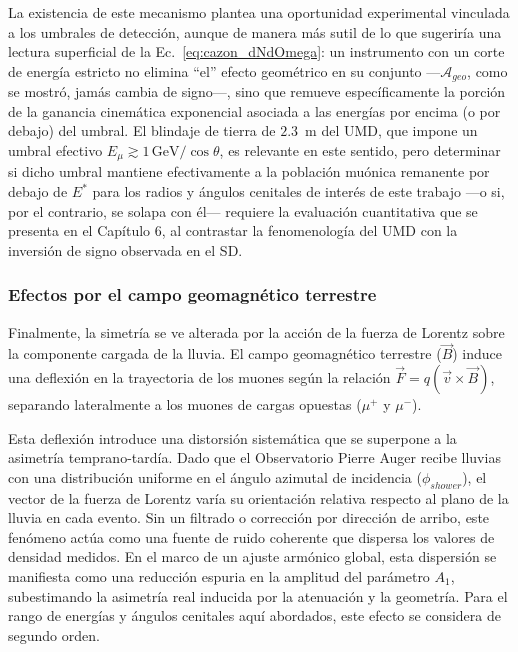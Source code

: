 La existencia de este mecanismo plantea una oportunidad experimental vinculada a los umbrales de detección, aunque de manera más sutil de lo que sugeriría una lectura superficial de la Ec.~\ref{eq:cazon_dNdOmega}: un instrumento con un corte de energía estricto no elimina ``el'' efecto geométrico en su conjunto —$\mathcal{A}_{geo}$, como se mostró, jamás cambia de signo—, sino que remueve específicamente la porción de la ganancia cinemática exponencial asociada a las energías por encima (o por debajo) del umbral. El blindaje de tierra de $2.3$~m del UMD, que impone un umbral efectivo $E_\mu \gtrsim 1\,\mathrm{GeV}/\cos\theta$, es relevante en este sentido, pero determinar si dicho umbral mantiene efectivamente a la población muónica remanente por debajo de $E^*$ para los radios y ángulos cenitales de interés de este trabajo —o si, por el contrario, se solapa con él— requiere la evaluación cuantitativa que se presenta en el Capítulo 6, al contrastar la fenomenología del UMD con la inversión de signo observada en el SD.

\subsubsection{Efectos por el campo geomagnético terrestre}
\label{subsubsec:geomagnetico}

Finalmente, la simetría se ve alterada por la acción de la fuerza de Lorentz sobre la componente cargada de la lluvia. El campo geomagnético terrestre ($\vec{B}$) induce una deflexión en la trayectoria de los muones según la relación $\vec{F} = q(\vec{v} \times \vec{B})$, separando lateralmente a los muones de cargas opuestas ($\mu^+$ y $\mu^-$).

Esta deflexión introduce una distorsión sistemática que se superpone a la asimetría temprano-tardía. Dado que el Observatorio Pierre Auger recibe lluvias con una distribución uniforme en el ángulo azimutal de incidencia ($\phi_{shower}$), el vector de la fuerza de Lorentz varía su orientación relativa respecto al plano de la lluvia en cada evento. Sin un filtrado o corrección por dirección de arribo, este fenómeno actúa como una fuente de ruido coherente que dispersa los valores de densidad medidos. En el marco de un ajuste armónico global, esta dispersión se manifiesta como una reducción espuria en la amplitud del parámetro $A_1$, subestimando la asimetría real inducida por la atenuación y la geometría. Para el rango de energías y ángulos cenitales aquí abordados, este efecto se considera de segundo orden.

